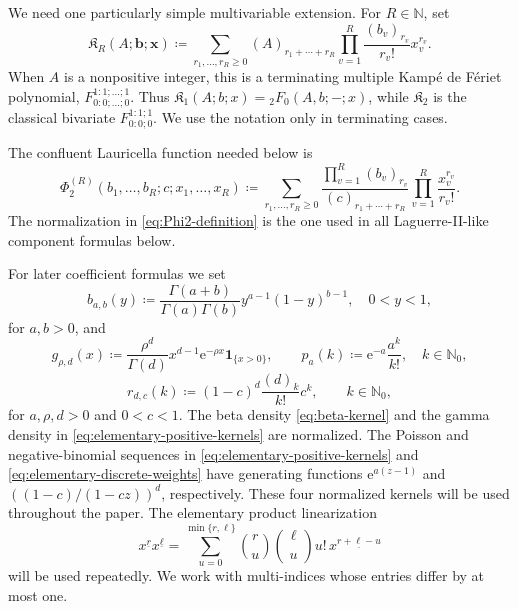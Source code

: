 \documentclass[10pt]{amsart}
\newcommand{\N}{\mathbb N}
\newcommand{\Nzero}{\mathbb N_0}
\newcommand{\e}{\mathrm e}
\newcommand{\fall}[2]{#1^{\underline{#2}}}
\theoremstyle{plain}
\theoremstyle{definition}
\theoremstyle{remark}
\begin{document}
We need one particularly simple multivariable extension. For \(R\in\N\),
set
\begin{equation}
 \mathfrak K_R
 \left(A;\boldsymbol b;\boldsymbol x\right)
 \coloneq\sum_{r_1,\ldots,r_R\ge0}
 (A)_{r_1+\cdots+r_R}
 \prod_{v=1}^R\frac{(b_v)_{r_v}}{r_v!}x_v^{r_v}.
 \label{eq:multiple-KdF-simple}
\end{equation}
When \(A\) is a nonpositive integer, this is a terminating multiple
Kamp\'e de F\'eriet polynomial,
\(F_{0:0;\ldots;0}^{1:1;\ldots;1}\). Thus
\(\mathfrak K_1(A;b;x)={}_2F_0(A,b;-;x)\), while
\(\mathfrak K_2\) is the classical bivariate
\(F_{0:0;0}^{1:1;1}\). We use the notation only in terminating cases.

The confluent Lauricella function needed below is
\begin{equation}
 \Phi_2^{(R)}
 (b_1,\ldots,b_R;c;x_1,\ldots,x_R)
 \coloneq\sum_{r_1,\ldots,r_R\ge0}
 \frac{\prod_{v=1}^R(b_v)_{r_v}}
 {(c)_{r_1+\cdots+r_R}}
 \prod_{v=1}^R\frac{x_v^{r_v}}{r_v!}.
 \label{eq:Phi2-definition}
\end{equation}
The normalization in \eqref{eq:Phi2-definition} is the one used in all
Laguerre-II-like component formulas below.

For later coefficient formulas we set
\begin{equation}
 b_{a,b}(y)\coloneq
 \frac{\Gamma(a+b)}{\Gamma(a)\Gamma(b)}
 y^{a-1}(1-y)^{b-1},\quad 0<y<1,
 \label{eq:beta-kernel}
\end{equation}
for \(a,b>0\), and
\begin{equation}
 g_{\rho,d}(x)\coloneq\frac{\rho^d}{\Gamma(d)}x^{d-1}\e^{-\rho x}
 \mathbf1_{\{x>0\}},\qquad
 p_a(k)\coloneq\e^{-a}\frac{a^k}{k!},\quad k\in\Nzero,
 \label{eq:elementary-positive-kernels}
\end{equation}
\begin{equation}
 r_{d,c}(k)\coloneq(1-c)^d\frac{(d)_k}{k!}c^k,\qquad k\in\Nzero,
 \label{eq:elementary-discrete-weights}
\end{equation}
for \(a,\rho,d>0\) and \(0<c<1\). The beta density
\eqref{eq:beta-kernel} and the gamma density in
\eqref{eq:elementary-positive-kernels} are normalized. The Poisson and
negative-binomial sequences in \eqref{eq:elementary-positive-kernels} and
\eqref{eq:elementary-discrete-weights} have generating functions
\(\e^{a(z-1)}\) and \(((1-c)/(1-cz))^d\), respectively. These four
normalized kernels will be used throughout the paper.
The elementary product linearization
\begin{equation}
 \fall{x}{r}\fall{x}{\ell}
 =\sum_{u=0}^{\min\{r,\ell\}}
 \binom ru\binom\ell u u!\,
 \fall{x}{r+\ell-u}
 \label{eq:falling-linearization}
\end{equation}
will be used repeatedly. We work with multi-indices whose entries differ
by at most one.
\end{document}
